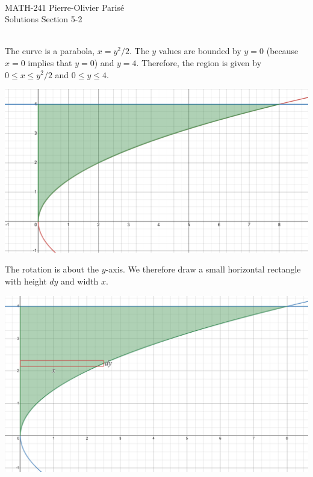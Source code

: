 


	\noindent \hrulefill \\
	MATH-241 \hfill Pierre-Olivier Paris{\'e}\\
	Solutions Section 5-2 \hfill \semester \\\vspace*{-1cm}
	
	\noindent\hrulefill
	
	\spc
	
	\\
	The curve is a parabola, $x = y^2/2$. The $y$ values are bounded by $y = 0$ (because $x = 0$ implies that $y = 0$) and $y = 4$. Therefore, the region is given by $0 \leq x \leq y^2/2$ and $0 \leq y \leq 4$.
	\begin{center}
	\includegraphics[scale=0.3]{fig3.png}
	\end{center}
	
	The rotation is about the $y$-axis. We therefore draw a small horizontal rectangle with height $dy$ and width $x$.
	
	\begin{center}
	\includegraphics[scale=0.3]{fig4.png}
	\end{center}
	
